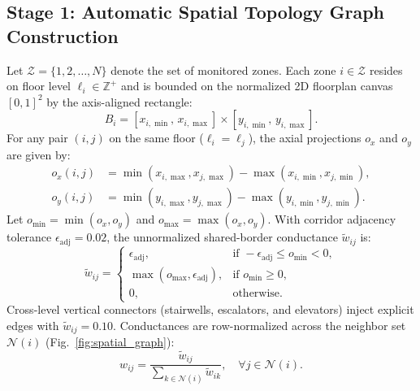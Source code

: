 \documentclass[conference,a4paper]{IEEEtran}
\begin{document}
\subsection{Stage 1: Automatic Spatial Topology Graph Construction}
\label{sec:stage1}
Let $\mathcal{Z} = \{1, 2, \dots, N\}$ denote the set of monitored zones. Each zone $i \in \mathcal{Z}$ resides on floor level $\ell_i \in \mathbb{Z}^+$ and is bounded on the normalized 2D floorplan canvas $[0, 1]^2$ by the axis-aligned rectangle:
\begin{equation}
B_i = [x_{i,\min},\, x_{i,\max}] \times [y_{i,\min},\, y_{i,\max}].
\label{eq:rect}
\end{equation}
For any pair $(i, j)$ on the same floor ($\ell_i = \ell_j$), the axial projections $o_x$ and $o_y$ are given by:
\begin{equation}
\begin{aligned}
o_x(i, j) &= \min(x_{i,\max}, x_{j,\max}) - \max(x_{i,\min}, x_{j,\min}), \\
o_y(i, j) &= \min(y_{i,\max}, y_{j,\max}) - \max(y_{i,\min}, y_{j,\min}).
\end{aligned}
\label{eq:overlap}
\end{equation}
Let $o_{\min} = \min(o_x, o_y)$ and $o_{\max} = \max(o_x, o_y)$. With corridor adjacency tolerance $\epsilon_{\mathrm{adj}} = 0.02$, the unnormalized shared-border conductance $\tilde{w}_{ij}$ is:
\begin{equation}
\tilde{w}_{ij} = \begin{cases} 
\epsilon_{\mathrm{adj}}, & \text{if } -\epsilon_{\mathrm{adj}} \le o_{\min} < 0, \\
\max(o_{\max}, \epsilon_{\mathrm{adj}}), & \text{if } o_{\min} \ge 0, \\
0, & \text{otherwise.}
\end{cases}
\label{eq:conductance}
\end{equation}
Cross-level vertical connectors (stairwells, escalators, and elevators) inject explicit edges with $\tilde{w}_{ij} = 0.10$. Conductances are row-normalized across the neighbor set $\mathcal{N}(i)$ (Fig.~\ref{fig:spatial_graph}):
\begin{equation}
w_{ij} = \frac{\tilde{w}_{ij}}{\sum_{k \in \mathcal{N}(i)} \tilde{w}_{ik}}, \quad \forall j \in \mathcal{N}(i).
\label{eq:row_norm}
\end{equation}
\end{document}
